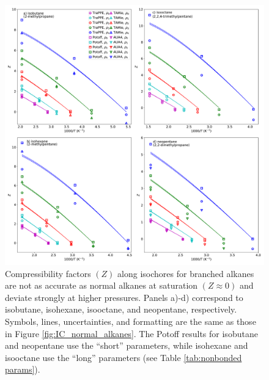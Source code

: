 \documentclass[preprint,letterpaper,floatfix,citeautoscript,aip,jcp]{revtex4-1}
\begin{document}

\begin{figure}[p!]
	\centering
	\includegraphics[width=6.4in]{IC_branched_alkanes_all_models}
	\caption{Compressibility factors $(Z)$ along isochores for branched alkanes are not as accurate as normal alkanes at saturation $(Z \approx 0)$ and deviate strongly at higher pressures. Panels a)-d) correspond to isobutane, isohexane, isooctane, and neopentane, respectively. Symbols, lines, uncertainties, and formatting are the same as those in Figure \ref{fig:IC_normal_alkanes}. The Potoff results for isobutane and neopentane use the ``short'' parameters, while isohexane and isooctane use the ``long'' parameters (see Table \ref{tab:nonbonded params}).}
	\label{fig:IC_branched_alkanes}
\end{figure}


\end{document}
